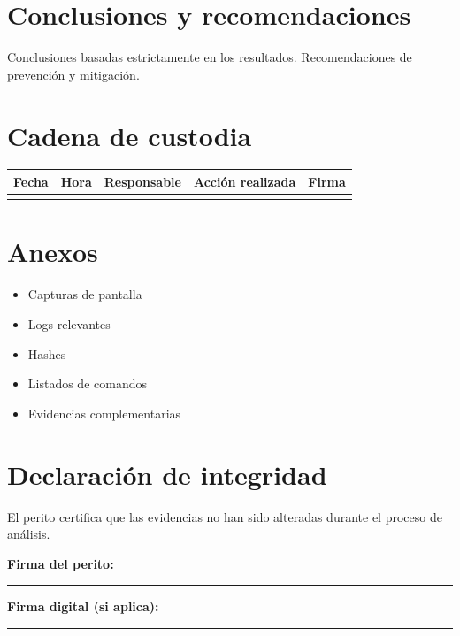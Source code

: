 \documentclass[12pt,a4paper]{article}
\begin{document}
\section{Conclusiones y recomendaciones}
Conclusiones basadas estrictamente en los resultados.
Recomendaciones de prevención y mitigación.

\newpage

\section{Cadena de custodia}

\begin{table}[H]
\centering
\begin{tabular}{|c|c|c|c|c|}
\hline
Fecha & Hora & Responsable & Acción realizada & Firma \\ \hline
 &  &  &  &  \\ \hline
\end{tabular}
\end{table}

\newpage

\section{Anexos}
\begin{itemize}
    \item Capturas de pantalla
    \item Logs relevantes
    \item Hashes
    \item Listados de comandos
    \item Evidencias complementarias
\end{itemize}

\newpage

\section{Declaración de integridad}
El perito certifica que las evidencias no han sido alteradas durante el proceso de análisis.

\vspace{2cm}

\noindent\textbf{Firma del perito:} \\
\rule{8cm}{0.3pt}

\vspace{1cm}

\noindent\textbf{Firma digital (si aplica):} \\
\rule{8cm}{0.3pt}
\end{document}
